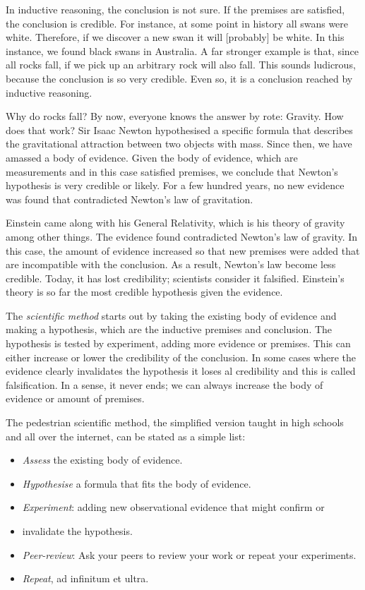 \begin{multicols}{2}
In inductive reasoning, the conclusion is not sure. If the premises are satisfied, the conclusion is credible. For instance, at some point in
history all swans were white. Therefore, if we discover a new swan it will [probably] be white. In this instance, we found black swans in Australia.
A far stronger example is that, since all rocks fall, if we pick up an arbitrary rock will also fall. This sounds ludicrous, because the conclusion
is so very credible. Even so, it is a conclusion reached by inductive reasoning.


Why do rocks fall? By now, everyone knows the answer by rote: Gravity. How does that work? Sir Isaac Newton hypothesised a specific formula that
describes the gravitational attraction between two objects with mass. Since then, we have amassed a body of evidence. Given the body of evidence,
which are measurements and in this case satisfied premises, we conclude that Newton's hypothesis is very credible or likely. For a few hundred
years, no new evidence was found that contradicted Newton's law of gravitation.


Einstein came along with his General Relativity, which is his theory of gravity among other things. The evidence found contradicted Newton's law
of gravity. In this case, the amount of evidence increased so that new premises were added that are incompatible with the conclusion. As a result,
Newton's law become less credible. Today, it has lost credibility; scientists consider it falsified. Einstein's theory is so far the most credible
hypothesis given the evidence.


The \emph{scientific method} starts out by taking the existing body of evidence and making a hypothesis, which are the inductive premises and
conclusion. The hypothesis is tested by experiment, adding more evidence or premises. This can either increase or lower the credibility of the 
conclusion. In some cases where the evidence clearly invalidates the hypothesis it loses al credibility and this is called falsification. In a sense,
it never ends; we can always increase the body of evidence or amount of premises.


The pedestrian scientific method, the simplified version taught in high schools and all over the internet, can be stated as a simple list:

\begin{itemize}
\item \emph{Assess} the existing body of evidence. 
\item \emph{Hypothesise} a formula that fits the body of evidence. 
\item \emph{Experiment}: adding new observational evidence that might confirm or \item invalidate the hypothesis. 
\item \emph{Peer-review}: Ask your peers to review your work or repeat your experiments. 
\item \emph{Repeat}, ad infinitum et ultra. 
\end{itemize}


\end{multicols}
